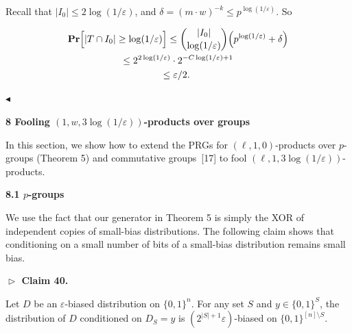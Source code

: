 \documentclass[10pt,a4paper]{article}
\begin{document}
Recall that $\lvert I_{0}\rvert\leq 2\log(1/\varepsilon)$, and $\delta=(m\cdot w)^{-k}\leq p^{\log(1/\varepsilon)}$.
So\par


\[\begin{gathered}
\displaystyle\mathop{\bf Pr\/}\Bigl{[}\lvert T\cap I_{0}\rvert\geq\log(1/\varepsilon)\Bigr{]} \displaystyle\leq\binom{\lvert I_{0}\rvert}{\log(1/\varepsilon)}\Bigl{(}p^{\log(1/\varepsilon)}+\delta\Bigr{)} \\
\displaystyle\leq 2^{2\log(1/\varepsilon)}\cdot 2^{-C\log(1/\varepsilon)+1} \\
\displaystyle\leq\varepsilon/2.\
\end{gathered}\]


$\blacktriangleleft$\par






\par\medskip\noindent\textbf{
8 Fooling $(1,w,3\log(1/\varepsilon))$-products over groups}\par




In this section, we show how to extend the PRGs for $(\ell,1,0)$-products over $p$-groups (Theorem 5) and commutative groups [17] to fool $(\ell,1,3\log(1/\varepsilon))$-products.\par




\par\medskip\noindent\textbf{
8.1 $p$-groups}\par




We use the fact that our generator in Theorem 5 is simply the XOR of independent copies of small-bias distributions.
The following claim shows that conditioning on a small number of bits of a small-bias distribution remains small bias.\par





\par\medskip\noindent\textbf{
$\vartriangleright$ Claim 40. }\par



Let $D$ be an $\varepsilon$-biased distribution on $\{0,1\}^{n}$.
For any set $S$ and $y\in\{0,1\}^{S}$, the distribution of $D$ conditioned on $D_{S}=y$ is $(2^{\lvert S\rvert+1}\varepsilon)$-biased on $\{0,1\}^{[n]\setminus S}$.\par
\end{document}
